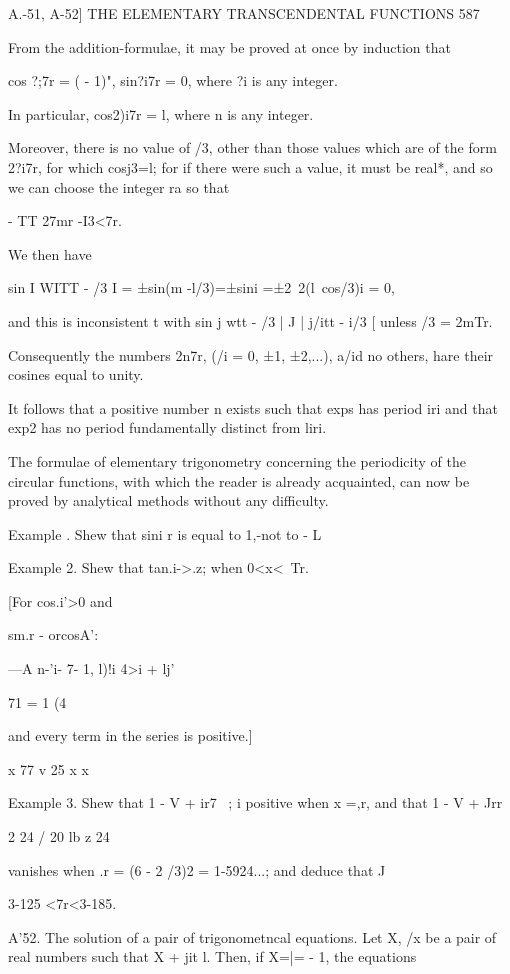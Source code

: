 A.-51, A-52] THE ELEMENTARY TRANSCENDENTAL FUNCTIONS 587

From the addition-formulae, it may be proved at once by induction that

cos ?;7r = ( - 1)", sin?i7r = 0, where ?i is any integer.

In particular, cos2)i7r = l, where n is any integer.

Moreover, there is no value of /3, other than those values which are
of the form 2?i7r, for which cosj3=l; for if there were such a value,
it must be real*, and so we can choose the integer ra so that

- TT 27mr -I3<7r.

We then have

sin I WITT - /3 I = ±sin(m -l/3)=±sini =±2~2(l\ cos/3)i = 0,

and this is inconsistent t with sin j wtt - /3 | J | j/itt - i/3 [
unless /3 = 2mTr.

Consequently the numbers 2n7r, (/i = 0, ±1, ±2,...), a/id no others,
hare their cosines equal to unity.

It follows that a positive number n exists such that exps has period
iri and that exp2 has no period fundamentally distinct from liri.

The formulae of elementary trigonometry concerning the periodicity of
the circular functions, with which the reader is already acquainted,
can now be proved by analytical methods without any difficulty.

Example . Shew that sini r is equal to 1,-not to - L

Example 2. Shew that tan.i->.z; when 0<x<\ Tr.

[For cos.i'>0 and



sm.r - orcosA':



---A n-'i- 7- 1, l)!i 4>i + lj'



71 = 1 (4

and every term in the series is positive.]

x 77 v 25 x x

Example 3. Shew that 1 - V + ir7 ~; i positive when x =,r, and that
1 - V + Jrr

2 24 / 20 lb z 24

vanishes when .r = (6 - 2 /3)2 = 1-5924...; and deduce that J

3-125 <7r<3-185.

A'52. The solution of a pair of trigonometncal equations. Let X, /x be
a pair of real numbers such that X + jit l. Then, if X=|= - 1, the
equations

